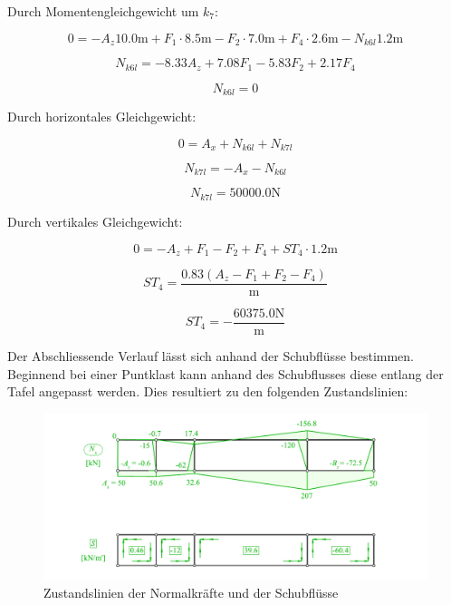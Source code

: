 \documentclass[
  12pt,
  letterpaper,
  DIV=11,
  egregdoesnotlikesansseriftitles]{scrartcl}
\begin{document}
Durch Momentengleichgewicht um \(k_{7}\):

\begin{equation}0 = - A_{z} 10.0 \text{m} + F_{1} \cdot 8.5 \text{m} - F_{2} \cdot 7.0 \text{m} + F_{4} \cdot 2.6 \text{m} - N_{k6l} 1.2 \text{m}\end{equation}

\begin{equation}N_{k6l} = - 8.33 A_{z} + 7.08 F_{1} - 5.83 F_{2} + 2.17 F_{4}\end{equation}

\begin{equation}N_{k6l} = 0\end{equation}

Durch horizontales Gleichgewicht:

\begin{equation}0 = A_{x} + N_{k6l} + N_{k7l}\end{equation}

\begin{equation}N_{k7l} = - A_{x} - N_{k6l}\end{equation}

\begin{equation}N_{k7l} = 50000.0 \text{N}\end{equation}

Durch vertikales Gleichgewicht:

\begin{equation}0 = - A_{z} + F_{1} - F_{2} + F_{4} + ST_{4} \cdot 1.2 \text{m}\end{equation}

\begin{equation}ST_{4} = \frac{0.83 \left(A_{z} - F_{1} + F_{2} - F_{4}\right)}{\text{m}}\end{equation}

\begin{equation}ST_{4} = - \frac{60375.0 \text{N}}{\text{m}}\end{equation}

Der Abschliessende Verlauf lässt sich anhand der Schubflüsse bestimmen.
Beginnend bei einer Puntklast kann anhand des Schubflusses diese entlang
der Tafel angepasst werden. Dies resultiert zu den folgenden
Zustandslinien:

\begin{figure}[H]

{\centering \includegraphics{BSI_HS23_Testat_03_files/mediabag/../images/Testat_03_HS23_N_S.pdf}

}

\caption{\label{fig-ZS_N_S}Zustandslinien der Normalkräfte und der
Schubflüsse}

\end{figure}
\end{document}
